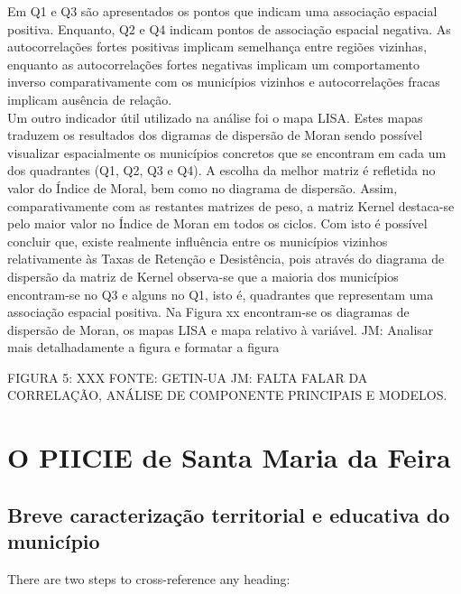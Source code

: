 \documentclass[
]{book}
\theoremstyle{definition}
\theoremstyle{definition}
\theoremstyle{definition}
\theoremstyle{definition}
\theoremstyle{remark}
\begin{document}
Em Q1 e Q3 são apresentados os pontos que indicam uma associação espacial positiva. Enquanto, Q2 e Q4 indicam pontos de associação espacial negativa. As autocorrelações fortes positivas implicam semelhança entre regiões vizinhas, enquanto as autocorrelações fortes negativas implicam um comportamento inverso comparativamente com os municípios vizinhos e autocorrelações fracas implicam ausência de relação.\\
Um outro indicador útil utilizado na análise foi o mapa LISA. Estes mapas traduzem os resultados dos digramas de dispersão de Moran sendo possível visualizar espacialmente os municípios concretos que se encontram em cada um dos quadrantes (Q1, Q2, Q3 e Q4).
A escolha da melhor matriz é refletida no valor do Índice de Moral, bem como no diagrama de dispersão. Assim, comparativamente com as restantes matrizes de peso, a matriz Kernel destaca-se pelo maior valor no Índice de Moran em todos os ciclos. Com isto é possível concluir que, existe realmente influência entre os municípios vizinhos relativamente às Taxas de Retenção e Desistência, pois através do diagrama de dispersão da matriz de Kernel observa-se que a maioria dos municípios encontram-se no Q3 e alguns no Q1, isto é, quadrantes que representam uma associação espacial positiva. Na Figura xx encontram-se os diagramas de dispersão de Moran, os mapas LISA e mapa relativo à variável.
JM: Analisar mais detalhadamente a figura e formatar a figura

FIGURA 5: XXX
FONTE: GETIN-UA
JM: FALTA FALAR DA CORRELAÇÃO, ANÁLISE DE COMPONENTE PRINCIPAIS E MODELOS.

\hypertarget{PIICIE}{%
\chapter{O PIICIE de Santa Maria da Feira}\label{PIICIE}}

\hypertarget{breve-caracterizauxe7uxe3o-territorial-e-educativa-do-municuxedpio}{%
\section{Breve caracterização territorial e educativa do município}\label{breve-caracterizauxe7uxe3o-territorial-e-educativa-do-municuxedpio}}

There are two steps to cross-reference any heading:
\end{document}
